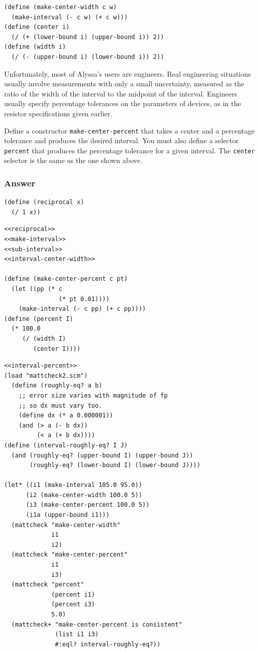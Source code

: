 \documentclass[final,fleqn,titlepage,twoside]{article}
\begin{document}
\begin{verbatim}
(define (make-center-width c w)
  (make-interval (- c w) (+ c w)))
(define (center i)
  (/ (+ (lower-bound i) (upper-bound i)) 2))
(define (width i)
  (/ (- (upper-bound i) (lower-bound i)) 2))
\end{verbatim}

Unfortunately, most of Alyssa's users are engineers. Real engineering situations
usually involve measurements with only a small uncertainty, measured as the
ratio of the width of the interval to the midpoint of the interval. Engineers
usually specify percentage tolerances on the parameters of devices, as in the
resistor specifications given earlier.

Define a constructor \texttt{make-center-percent} that takes a center and a
percentage tolerance and produces the desired interval. You must also define a
selector \texttt{percent} that produces the percentage tolerance for a given
interval. The \texttt{center} selector is the same as the one shown above.

\subsubsection{Answer}
\label{sec:orgc7c5cd7}
\begin{verbatim}
(define (reciprocal x)
  (/ 1 x))
\end{verbatim}
\begin{verbatim}
<<reciprocal>>
<<make-interval>>
<<sub-interval>>
<<interval-center-width>>

(define (make-center-percent c pt)
  (let ((pp (* c
               (* pt 0.01))))
    (make-interval (- c pp) (+ c pp))))
(define (percent I)
  (* 100.0
     (/ (width I)
        (center I))))
\end{verbatim}

\begin{verbatim}
<<interval-percent>>
(load "mattcheck2.scm")
  (define (roughly-eq? a b)
    ;; error size varies with magnitude of fp
    ;; so dx must vary too.
    (define dx (* a 0.000001))
    (and (> a (- b dx))
         (< a (+ b dx))))
(define (interval-roughly-eq? I J)
  (and (roughly-eq? (upper-bound I) (upper-bound J))
       (roughly-eq? (lower-bound I) (lower-bound J))))

(let* ((i1 (make-interval 105.0 95.0))
      (i2 (make-center-width 100.0 5))
      (i3 (make-center-percent 100.0 5))
      (i1a (upper-bound i1)))
  (mattcheck "make-center-width"
             i1
             i2)
  (mattcheck "make-center-percent"
             i1
             i3)
  (mattcheck "percent"
             (percent i1)
             (percent i3)
             5.0)
  (mattcheck+ "make-center-percent is consistent"
              (list i1 i3)
              #:eql? interval-roughly-eq?))
\end{verbatim}
\end{document}
